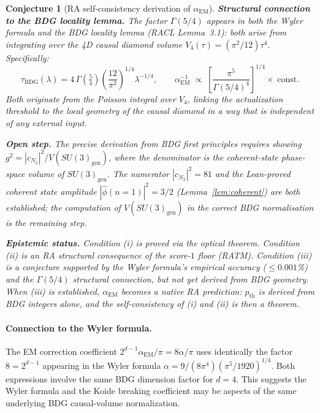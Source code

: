 \documentclass[11pt,a4paper]{article}
\newtheorem{conjecture}[theorem]{Conjecture}
\begin{document}
\begin{conjecture}[RA self-consistency derivation of $\alpha_{\mathrm{EM}}$]
\noindent
\textbf{Structural connection to the BDG locality lemma.}
The factor $\Gamma(5/4)$ appears in both the Wyler formula and the
BDG locality lemma (RACL Lemma~3.1): both arise from integrating
over the 4D causal diamond volume $V_4(\tau) = (\pi^2/12)\tau^4$.
Specifically:
\begin{equation}
  \tau_{\mathrm{BDG}}(\lambda)
  = 4\,\Gamma\!\left(\tfrac{5}{4}\right)
    \left(\frac{12}{\pi^2}\right)^{\!1/4} \lambda^{-1/4},
  \qquad
  \alpha_{\mathrm{EM}}^{-1} \;\propto\;
  \left[\frac{\pi^5}{\Gamma(5/4)^4}\right]^{1/4} \!\times\; \text{const}.
\end{equation}
Both originate from the Poisson integral over $V_4$, linking the
actualization threshold to the local geometry of the causal diamond
in a way that is independent of any external input.

\noindent
\textbf{Open step.}
The precise derivation from BDG first principles requires showing
$g^2 = |c_{N_2}|^2 / V(SU(3)_{\mathrm{gen}})$, where the denominator
is the coherent-state phase-space volume of $SU(3)_{\mathrm{gen}}$.
The numerator $|c_{N_2}|^2 = 81$ and the Lean-proved coherent state
amplitude $|\hat\phi(n{=}1)|^2 = 3/2$ (Lemma~\ref{lem:coherent})
are both established; the computation of $V(SU(3)_{\mathrm{gen}})$
in the correct BDG normalisation is the remaining step.

\noindent
\textbf{Epistemic status.}
Condition (i) is proved via the optical theorem.
Condition (ii) is an RA structural consequence of the score-$1$ floor (RATM).
Condition (iii) is a conjecture supported by the Wyler formula's
empirical accuracy ($\leq 0.001$\%) and the $\Gamma(5/4)$ structural
connection, but not yet derived from BDG geometry.
When (iii) is established, $\alpha_{\mathrm{EM}}$ becomes a native
RA prediction: $p_{\mathrm{th}}$ is derived from BDG integers alone,
and the self-consistency of (i) and (ii) is then a theorem.
\end{conjecture}


\paragraph{Connection to the Wyler formula.}
The EM correction coefficient $2^{d-1}\alpha_{\mathrm{EM}}/\pi = 8\alpha/\pi$
uses identically the factor $8 = 2^{d-1}$ appearing in the Wyler formula
$\alpha = 9/(8\pi^4)(\pi^5/1920)^{1/4}$. Both expressions involve the same
BDG dimension factor for $d=4$. This suggests the Wyler formula and the
Koide breaking coefficient may be aspects of the same underlying BDG
causal-volume normalization.
\end{document}
